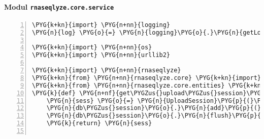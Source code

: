 \paragraph{Modul \texttt{rnaseqlyze.core.service}}
\label{rnaseqlyze-pdf:modul-rnaseqlyze-core-service}
\begin{Verbatim}[commandchars=\\\{\},numbers=left,firstnumber=1,stepnumber=5]
\PYG{k+kn}{import} \PYG{n+nn}{logging}
\PYG{n}{log} \PYG{o}{=} \PYG{n}{logging}\PYG{o}{.}\PYG{n}{getLogger}\PYG{p}{(}\PYG{n}{\PYGZus{}\PYGZus{}name\PYGZus{}\PYGZus{}}\PYG{p}{)}

\PYG{k+kn}{import} \PYG{n+nn}{os}
\PYG{k+kn}{import} \PYG{n+nn}{urllib2}

\PYG{k+kn}{import} \PYG{n+nn}{rnaseqlyze}
\PYG{k+kn}{from} \PYG{n+nn}{rnaseqlyze.core} \PYG{k+kn}{import} \PYG{n}{security}
\PYG{k+kn}{from} \PYG{n+nn}{rnaseqlyze.core.entities} \PYG{k+kn}{import} \PYG{n}{Analysis}\PYG{p}{,} \PYG{n}{User}\PYG{p}{,} \PYG{n}{RNASeqRun}\PYG{p}{,} \PYG{n}{UploadSession}
\PYG{k}{def} \PYG{n+nf}{get\PYGZus{}upload\PYGZus{}session}\PYG{p}{(}\PYG{n}{db\PYGZus{}session}\PYG{p}{)}\PYG{p}{:}
    \PYG{n}{sess} \PYG{o}{=} \PYG{n}{UploadSession}\PYG{p}{(}\PYG{p}{)}
    \PYG{n}{db\PYGZus{}session}\PYG{o}{.}\PYG{n}{add}\PYG{p}{(}\PYG{n}{sess}\PYG{p}{)}
    \PYG{n}{db\PYGZus{}session}\PYG{o}{.}\PYG{n}{flush}\PYG{p}{(}\PYG{p}{)}
    \PYG{k}{return} \PYG{n}{sess}


\end{Verbatim}
